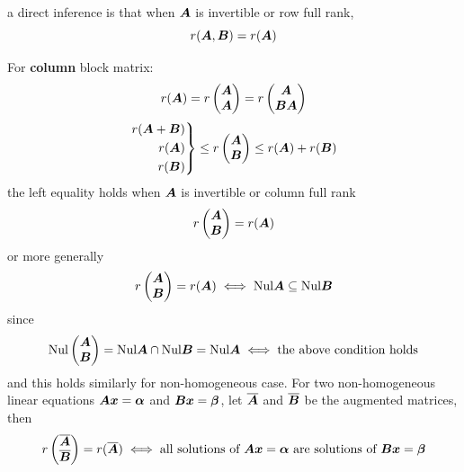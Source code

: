 \documentclass{overview}
\begin{document}
a direct inference is that when $\boldsymbol{A}$ is invertible or row full rank,
\[
	r(\boldsymbol{A} , \boldsymbol{B}) = r(\boldsymbol{A})
\]

For \textbf{column} block matrix:
\[
	r(\boldsymbol{A})= r\begin{pmatrix} \boldsymbol{A} \\ \boldsymbol{A} \end{pmatrix}= r\begin{pmatrix} \boldsymbol{A} \\ \boldsymbol{B}\boldsymbol{A} \end{pmatrix}
\]
\[
		\left.\begin{aligned}
				r(\boldsymbol{A}+\boldsymbol{B})\\ r(\boldsymbol{A}) \\ r(\boldsymbol{B})
		\end{aligned}\right\} 
		\leq r\begin{pmatrix} \boldsymbol{A} \\ \boldsymbol{B} \end{pmatrix} \leq r(\boldsymbol{A})+r(\boldsymbol{B})
		\]
the left equality holds when $\boldsymbol{A}$ is invertible or column full rank
\[
	r\begin{pmatrix} \boldsymbol{A} \\ \boldsymbol{B} \end{pmatrix} = r(\boldsymbol{A})
\]
or more generally
\begin{equation}
	r\begin{pmatrix} \boldsymbol{A} \\ \boldsymbol{B}\end{pmatrix} = r(\boldsymbol{A})
	\iff
	\text{Nul}\boldsymbol{A} \subseteq \text{Nul}\boldsymbol{B}
	\label{eq:sameRkSameNul}
\end{equation}
since 
\[
	\text{Nul}\begin{pmatrix}\boldsymbol{A} \\ \boldsymbol{B}\end{pmatrix}
	= \text{Nul}\boldsymbol{A} \cap \text{Nul}\boldsymbol{B}
	= \text{Nul}\boldsymbol{A}
	\iff \text{the above condition holds}
\] 
and this holds similarly for non-homogeneous case.
For two non-homogeneous linear equations $\boldsymbol{A}\boldsymbol{x}=\boldsymbol{\alpha}$
and $\boldsymbol{B}\boldsymbol{x}=\boldsymbol{\beta}$, let $\overline{\boldsymbol{A}}$ and $\overline{\boldsymbol{B}}$ be the augmented matrices,
then
\begin{equation}
	r\begin{pmatrix} \overline{\boldsymbol{A}} \\ \overline{\boldsymbol{B}} \end{pmatrix}
	= r(\overline{\boldsymbol{A}})
	\iff
	\text{all solutions of } \boldsymbol{A}\boldsymbol{x}=\boldsymbol{\alpha}
	\text{ are solutions of } \boldsymbol{B}\boldsymbol{x}=\boldsymbol{\beta}
	\label{eq:sameRkSameSolNonhomo}
\end{equation}
\end{document}
